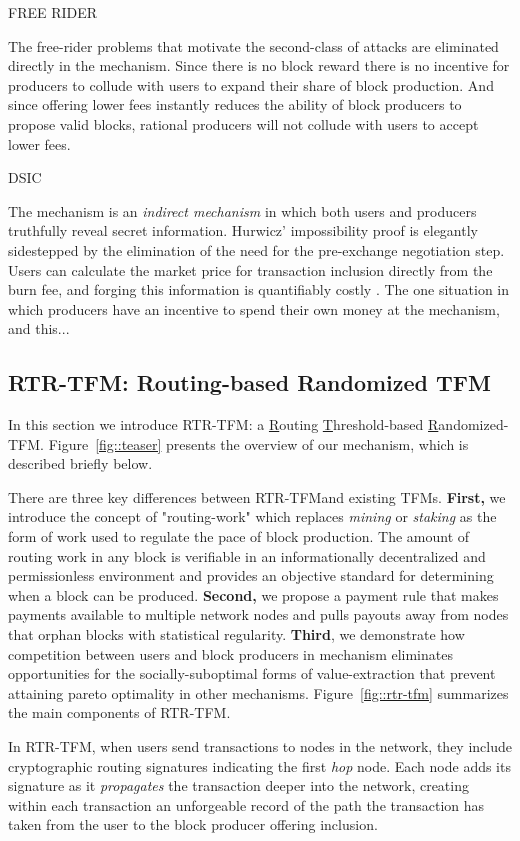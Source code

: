 \documentclass[sigconf,anonymous]{aamas}
\newcommand{\ourTFM}{\textsc{RTR-TFM}}
\begin{document}
FREE RIDER

The free-rider problems that motivate the second-class of attacks are eliminated directly in the mechanism. Since there is no block reward there is no incentive for producers to collude with users to expand their share of block production. And since offering lower fees instantly reduces the ability of block producers to propose valid blocks, rational producers will not collude with users to accept lower fees.

DSIC

The mechanism is an \textit{indirect mechanism} in which both users and producers truthfully reveal secret information. Hurwicz' impossibility proof is elegantly sidestepped by the elimination of the need for the pre-exchange negotiation step. Users can calculate the market price for transaction inclusion directly from the burn fee, and forging this information is quantifiably costly . The one situation in which producers have an incentive to spend their own money at the mechanism, and this...


\subsection*{RTR-TFM: Routing-based Randomized TFM}

In this section we introduce \ourTFM: a \underline{R}outing \underline{T}hreshold-based \underline{R}andomized-TFM. Figure~\ref{fig::teaser} presents the overview of our mechanism, which is described briefly below.

There are three key differences between \ourTFM and  existing TFMs. \textbf{First,} we introduce the concept of "routing-work" which replaces \textit{mining} or \textit{staking} as the form of work used to regulate the pace of block production. The amount of routing work in any block is verifiable in an informationally decentralized and permissionless environment and provides an objective standard for determining when a block can be produced. \textbf{Second,} we propose a payment rule that makes payments available to multiple network nodes and pulls payouts away from nodes that orphan blocks with statistical regularity. \textbf{Third}, we demonstrate how competition between users and block producers in mechanism eliminates opportunities for the socially-suboptimal forms of value-extraction that prevent attaining pareto optimality in other mechanisms. Figure~\ref{fig::rtr-tfm} summarizes the main components of \ourTFM. 

In \ourTFM, when users send transactions to nodes in the network, they include cryptographic routing signatures indicating the first \emph{hop} node. Each node adds its signature as it \emph{propagates} the transaction deeper into the network, creating within each transaction an unforgeable record of the path the transaction has taken from the user to the block producer offering inclusion.
\end{document}
